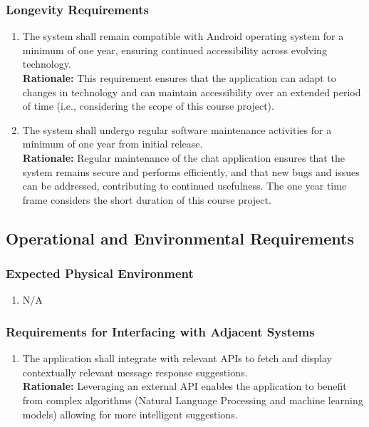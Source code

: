 \documentclass[]{article}
\begin{document}
\subsubsection{Longevity Requirements}
\label{ssub:longevity_requirements}
\begin{enumerate}[{PR-L}1. ]
	\item The system shall remain compatible with Android operating system for a minimum of one year, ensuring continued
	      accessibility across evolving technology. \\
	      {\bf Rationale:} This requirement ensures that the application can adapt to changes in technology and can maintain
	      accessibility over an extended period of time (i.e., considering the scope of this course project).
	\item The system shall undergo regular software maintenance activities for a minimum of one year from initial release. \\
	      {\bf Rationale:} Regular maintenance of the chat application ensures that the system remains secure and performs efficiently, and
	      that new bugs and issues can be addressed, contributing to continued usefulness. The one year time frame considers the short duration
	      of this course project.
\end{enumerate}


\subsection{Operational and Environmental Requirements}
\label{sub:operational_and_environmental_requirements}
\subsubsection{Expected Physical Environment}
\label{ssub:expected_physical_environment}
\begin{enumerate}[{OE-EPE}1. ]
	\item N/A
\end{enumerate}
\subsubsection{Requirements for Interfacing with Adjacent Systems}
\label{ssub:requirements_for_interfacing_with_adjacent_systems}
\begin{enumerate}[{OE-IA}1. ]
	\item The application shall integrate with relevant APIs to fetch and display contextually relevant message response suggestions.\\
	      {\bf Rationale:} Leveraging an external API enables the application to benefit from complex algorithms (Natural Language Processing and
	      machine learning models) allowing for more intelligent suggestions.
\end{enumerate}
\end{document}
